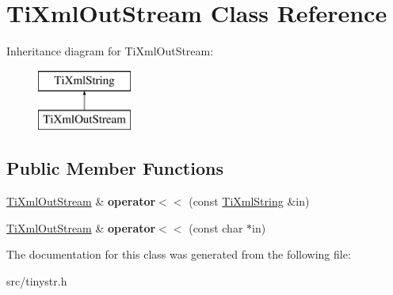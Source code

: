 \hypertarget{classTiXmlOutStream}{
\section{\-Ti\-Xml\-Out\-Stream \-Class \-Reference}
\label{dc/d34/classTiXmlOutStream}
}
\-Inheritance diagram for \-Ti\-Xml\-Out\-Stream\-:\begin{figure}[H]
\begin{center}
\leavevmode
\includegraphics[height=2.000000cm]{dc/d34/classTiXmlOutStream}
\end{center}
\end{figure}
\subsection*{\-Public \-Member \-Functions}
\begin{DoxyCompactItemize}
\item 
\hypertarget{classTiXmlOutStream_a3640dcb1c0903be3bc6966cdc9a79db6}{
\hyperlink{classTiXmlOutStream}{\-Ti\-Xml\-Out\-Stream} \& {\bfseries operator$<$$<$} (const \hyperlink{classTiXmlString}{\-Ti\-Xml\-String} \&in)}
\label{dc/d34/classTiXmlOutStream_a3640dcb1c0903be3bc6966cdc9a79db6}

\item 
\hypertarget{classTiXmlOutStream_af2117e5a8cbfcb69544804ad2859bfb6}{
\hyperlink{classTiXmlOutStream}{\-Ti\-Xml\-Out\-Stream} \& {\bfseries operator$<$$<$} (const char $\ast$in)}
\label{dc/d34/classTiXmlOutStream_af2117e5a8cbfcb69544804ad2859bfb6}

\end{DoxyCompactItemize}


\-The documentation for this class was generated from the following file\-:\begin{DoxyCompactItemize}
\item 
src/tinystr.\-h\end{DoxyCompactItemize}
